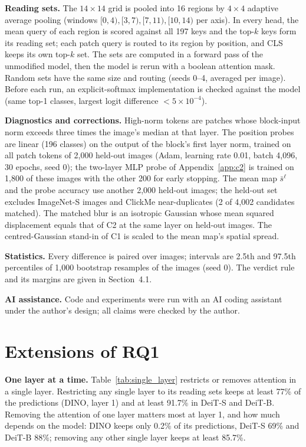\textbf{Reading sets.} The $14\times14$ grid is pooled into 16 regions by $4\times4$ adaptive average pooling (windows $[0,4), [3,7), [7,11), [10,14)$ per axis). In every head, the mean query of each region is scored against all 197 keys and the top-$k$ keys form its reading set; each patch query is routed to its region by position, and CLS keeps its own top-$k$ set. The sets are computed in a forward pass of the unmodified model, then the model is rerun with a boolean attention mask. Random sets have the same size and routing (seeds 0--4, averaged per image). Before each run, an explicit-softmax implementation is checked against the model (same top-1 classes, largest logit difference $<5\times10^{-4}$).

\textbf{Diagnostics and corrections.} High-norm tokens are patches whose block-input norm exceeds three times the image's median at that layer. The position probes are linear (196 classes) on the output of the block's first layer norm, trained on all patch tokens of 2,000 held-out images (Adam, learning rate 0.01, batch 4,096, 30 epochs, seed 0); the two-layer MLP probe of Appendix~\ref{app:c2} is trained on 1,800 of these images with the other 200 for early stopping. The mean map $\bar s^\ell$ and the probe accuracy use another 2,000 held-out images; the held-out set excludes ImageNet-S images and ClickMe near-duplicates (2 of 4,002 candidates matched). The matched blur is an isotropic Gaussian whose mean squared displacement equals that of C2 at the same layer on held-out images. The centred-Gaussian stand-in of C1 is scaled to the mean map's spatial spread.

\textbf{Statistics.} Every difference is paired over images; intervals are 2.5th and 97.5th percentiles of 1,000 bootstrap resamples of the images (seed 0). The verdict rule and its margins are given in Section~4.1.

\textbf{AI assistance.} Code and experiments were run with an AI coding assistant under the author's design; all claims were checked by the author.

\FloatBarrier
\section{Extensions of RQ1}
\label{app:rq1}

\textbf{One layer at a time.} Table~\ref{tab:single_layer} restricts or removes attention in a single layer. Restricting any single layer to its reading sets keeps at least 77\% of the predictions (DINO, layer 1) and at least 91.7\% in DeiT-S and DeiT-B. Removing the attention of one layer matters most at layer 1, and how much depends on the model: DINO keeps only 0.2\% of its predictions, DeiT-S 69\% and DeiT-B 88\%; removing any other single layer keeps at least 85.7\%.

